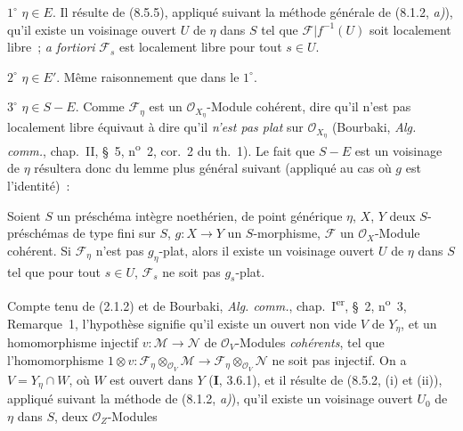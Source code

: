 $1^\circ$ $\eta\in E$. Il résulte de (8.5.5), appliqué suivant la méthode
générale de (8.1.2, \emph{a)}), qu'il existe un voisinage ouvert $U$ de $\eta$
dans $S$ tel que $\mathcal F|f^{-1}(U)$ soit localement libre~;
\emph{a fortiori} $\mathcal F_s$ est localement libre pour tout $s\in U$.

$2^\circ$ $\eta\in E'$. Même raisonnement que dans le $1^\circ$.

$3^\circ$ $\eta\in S-E$. Comme $\mathcal F_\eta$ est un
$\mathcal O_{X_\eta}$-Module cohérent, dire qu'il n'est pas localement libre
équivaut à dire qu'il \emph{n'est pas plat} sur $\mathcal O_{X_\eta}$
(Bourbaki, \emph{Alg. comm.}, chap.~II, \S~5, n\textsuperscript{o}~2,
cor.~2 du th.~1). Le fait que $S-E$ est un voisinage de $\eta$ résultera donc
du lemme plus général suivant (appliqué au cas où $g$ est l'identité)~:

\begin{lemma}[9.4.7.1]
\label{IV.9.4.7.1-fr}
Soient $S$ un préschéma intègre noethérien, de point générique $\eta$, $X$,
$Y$ deux $S$-préschémas de type fini sur $S$, $g:X\to Y$ un $S$-morphisme,
$\mathcal F$ un $\mathcal O_X$-Module cohérent. Si $\mathcal F_\eta$ n'est
pas $g_\eta$-plat, alors il existe un voisinage ouvert $U$ de $\eta$ dans $S$
tel que pour tout $s\in U$, $\mathcal F_s$ ne soit pas $g_s$-plat.
\end{lemma}

Compte tenu de (2.1.2) et de Bourbaki, \emph{Alg. comm.}, chap.~I\textsuperscript{er},
\S~2, n\textsuperscript{o}~3, Remarque~1, l'hypothèse signifie qu'il existe un
ouvert non vide $V$ de $Y_\eta$, et un homomorphisme injectif
$v:\mathcal M\to\mathcal N$ de $\mathcal O_V$-Modules \emph{cohérents}, tel
que l'homomorphisme
$1\otimes v:\mathcal F_\eta\otimes_{\mathcal O_V}\mathcal M\to
\mathcal F_\eta\otimes_{\mathcal O_V}\mathcal N$ ne soit pas injectif. On a
$V=Y_\eta\cap W$, où $W$ est ouvert dans $Y$ (\textbf{I}, 3.6.1), et il
résulte de (8.5.2, (i) et (ii)), appliqué suivant la méthode de
(8.1.2, \emph{a)}), qu'il existe un voisinage ouvert $U_0$ de $\eta$ dans $S$,
deux $\mathcal O_Z$-Modules

